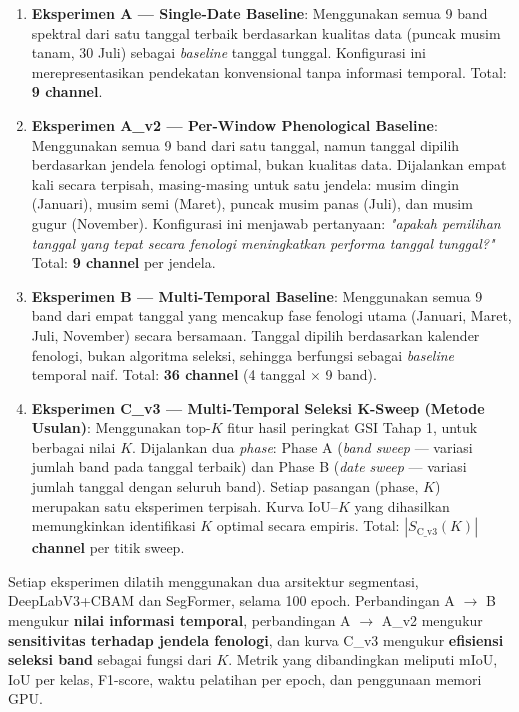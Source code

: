 \begin{enumerate}
    \item \textbf{Eksperimen A — Single-Date Baseline}:
    Menggunakan semua 9 band spektral dari satu tanggal terbaik berdasarkan kualitas data (puncak musim tanam, 30 Juli) sebagai \textit{baseline} tanggal tunggal.
    Konfigurasi ini merepresentasikan pendekatan konvensional tanpa informasi temporal.
    Total: \textbf{9 channel}.

    \item \textbf{Eksperimen A\_v2 — Per-Window Phenological Baseline}:
    Menggunakan semua 9 band dari satu tanggal, namun tanggal dipilih berdasarkan jendela fenologi optimal, bukan kualitas data.
    Dijalankan empat kali secara terpisah, masing-masing untuk satu jendela: musim dingin (Januari), musim semi (Maret), puncak musim panas (Juli), dan musim gugur (November).
    Konfigurasi ini menjawab pertanyaan: \textit{"apakah pemilihan tanggal yang tepat secara fenologi meningkatkan performa tanggal tunggal?"}
    Total: \textbf{9 channel} per jendela.

    \item \textbf{Eksperimen B — Multi-Temporal Baseline}:
    Menggunakan semua 9 band dari empat tanggal yang mencakup fase fenologi utama (Januari, Maret, Juli, November) secara bersamaan.
    Tanggal dipilih berdasarkan kalender fenologi, bukan algoritma seleksi, sehingga berfungsi sebagai \textit{baseline} temporal naif.
    Total: \textbf{36 channel} (4 tanggal $\times$ 9 band).

    \item \textbf{Eksperimen C\_v3 — Multi-Temporal Seleksi K-Sweep (Metode Usulan)}:
    Menggunakan top-$K$ fitur hasil peringkat GSI Tahap 1, untuk berbagai nilai $K$.
    Dijalankan dua \textit{phase}: Phase A (\textit{band sweep} — variasi jumlah band pada tanggal terbaik) dan Phase B (\textit{date sweep} — variasi jumlah tanggal dengan seluruh band).
    Setiap pasangan (phase, $K$) merupakan satu eksperimen terpisah.
    Kurva IoU--$K$ yang dihasilkan memungkinkan identifikasi $K$ optimal secara empiris.
    Total: \textbf{$|S_{\text{C\_v3}}(K)|$ channel} per titik sweep.
\end{enumerate}

Setiap eksperimen dilatih menggunakan dua arsitektur segmentasi, DeepLabV3+CBAM dan SegFormer, selama 100 epoch.
Perbandingan A $\to$ B mengukur \textbf{nilai informasi temporal}, perbandingan A $\to$ A\_v2 mengukur \textbf{sensitivitas terhadap jendela fenologi}, dan kurva C\_v3 mengukur \textbf{efisiensi seleksi band} sebagai fungsi dari $K$.
Metrik yang dibandingkan meliputi mIoU, IoU per kelas, F1-score, waktu pelatihan per epoch, dan penggunaan memori GPU.

